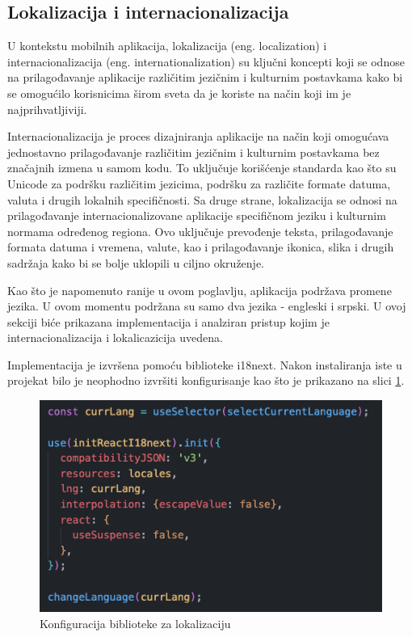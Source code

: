 \documentclass[12pt,oneside]{memoir}
\begin{document}
\subsection{Lokalizacija i internacionalizacija}

U kontekstu mobilnih aplikacija, lokalizacija (eng. localization) i internacionalizacija (eng. internationalization) su ključni koncepti koji se odnose na prilagođavanje aplikacije različitim jezičnim i kulturnim postavkama kako bi se omogućilo korisnicima širom sveta da je koriste na način koji im je najprihvatljiviji.

Internacionalizacija je proces dizajniranja aplikacije na način koji omogućava jednostavno prilagođavanje različitim jezičnim i kulturnim postavkama bez značajnih izmena u samom kodu. To uključuje korišćenje standarda kao što su Unicode za podršku različitim jezicima, podršku za različite formate datuma, valuta i drugih lokalnih specifičnosti. Sa druge strane, lokalizacija se odnosi na prilagođavanje internacionalizovane aplikacije specifičnom jeziku i kulturnim normama određenog regiona. Ovo uključuje prevođenje teksta, prilagođavanje formata datuma i vremena, valute, kao i prilagođavanje ikonica, slika i drugih sadržaja kako bi se bolje uklopili u ciljno okruženje.

Kao što je napomenuto ranije u ovom poglavlju, aplikacija podržava promene jezika. U ovom momentu podržana su samo dva jezika - engleski i srpski. U ovoj sekciji biće prikazana implementacija i analziran pristup kojim je internacionalizacija i lokalicazicija uvedena.

Implementacija je izvršena pomoću biblioteke i18next. Nakon instaliranja iste u projekat bilo je neophodno izvršiti konfigurisanje kao što je prikazano na slici \ref{fig:localizationConf}.

\begin{figure}[h]
    \centering
    \includegraphics[scale=0.5]{docs/images/chapterFour/langConf.png}
    \caption{Konfiguracija biblioteke za lokalizaciju}
    \label{fig:localizationConf}
\end{figure}
\end{document}
